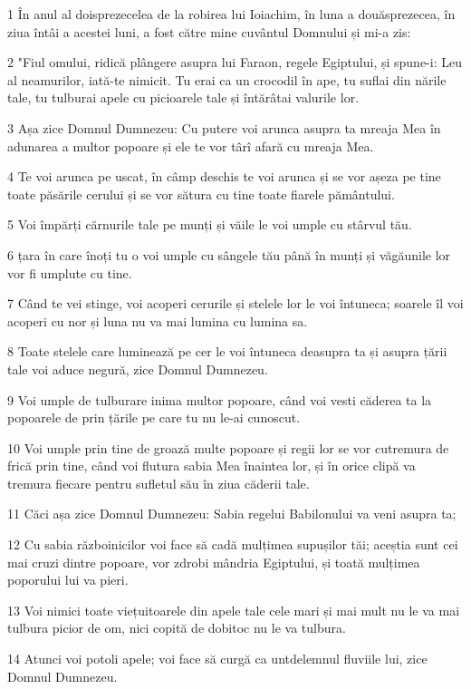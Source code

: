 \par 1 În anul al doisprezecelea de la robirea lui Ioiachim, în luna a douăsprezecea, în ziua întâi a acestei luni, a fost către mine cuvântul Domnului și mi-a zis:
\par 2 "Fiul omului, ridică plângere asupra lui Faraon, regele Egiptului, și spune-i: Leu al neamurilor, iată-te nimicit. Tu erai ca un crocodil în ape, tu suflai din nările tale, tu tulburai apele cu picioarele tale și întărâtai valurile lor.
\par 3 Așa zice Domnul Dumnezeu: Cu putere voi arunca asupra ta mreaja Mea în adunarea a multor popoare și ele te vor târî afară cu mreaja Mea.
\par 4 Te voi arunca pe uscat, în câmp deschis te voi arunca și se vor așeza pe tine toate păsările cerului și se vor sătura cu tine toate fiarele pământului.
\par 5 Voi împărți cărnurile tale pe munți și văile le voi umple cu stârvul tău.
\par 6 țara în care înoți tu o voi umple cu sângele tău până în munți și văgăunile lor vor fi umplute cu tine.
\par 7 Când te vei stinge, voi acoperi cerurile și stelele lor le voi întuneca; soarele îl voi acoperi cu nor și luna nu va mai lumina cu lumina sa.
\par 8 Toate stelele care luminează pe cer le voi întuneca deasupra ta și asupra țării tale voi aduce negură, zice Domnul Dumnezeu.
\par 9 Voi umple de tulburare inima multor popoare, când voi vesti căderea ta la popoarele de prin țările pe care tu nu le-ai cunoscut.
\par 10 Voi umple prin tine de groază multe popoare și regii lor se vor cutremura de frică prin tine, când voi flutura sabia Mea înaintea lor, și în orice clipă va tremura fiecare pentru sufletul său în ziua căderii tale.
\par 11 Căci așa zice Domnul Dumnezeu: Sabia regelui Babilonului va veni asupra ta;
\par 12 Cu sabia războinicilor voi face să cadă mulțimea supușilor tăi; aceștia sunt cei mai cruzi dintre popoare, vor zdrobi mândria Egiptului, și toată mulțimea poporului lui va pieri.
\par 13 Voi nimici toate viețuitoarele din apele tale cele mari și mai mult nu le va mai tulbura picior de om, nici copită de dobitoc nu le va tulbura.
\par 14 Atunci voi potoli apele; voi face să curgă ca untdelemnul fluviile lui, zice Domnul Dumnezeu.
